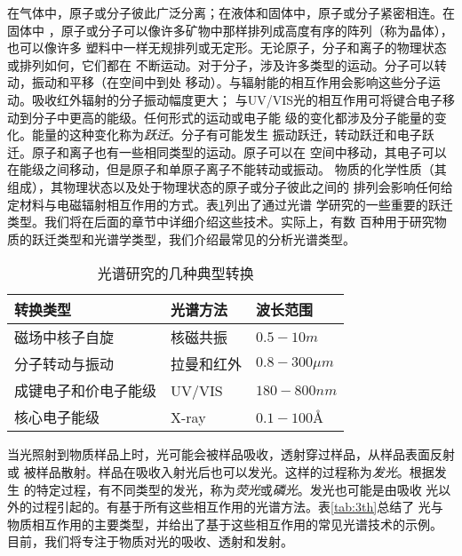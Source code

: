 在气体中，原子或分子彼此广泛分离；在液体和固体中，原子或分子紧密相连。在固体中
，原子或分子可以像许多矿物中那样排列成高度有序的阵列（称为晶体），也可以像许多
塑料中一样无规排列或无定形。无论原子，分子和离子的物理状态或排列如何，它们都在
不断运动。对于分子，涉及许多类型的运动。分子可以转动，振动和平移（在空间中到处
移动）。与辐射能的相互作用会影响这些分子运动。吸收红外辐射的分子振动幅度更大；
与UV/VIS光的相互作用可将键合电子移动到分子中更高的能级。任何形式的运动或电子能
级的变化都涉及分子能量的变化。能量的这种变化称为\emph{跃迁}。分子有可能发生
振动跃迁，转动跃迁和电子跃迁。原子和离子也有一些相同类型的运动。原子可以在
空间中移动，其电子可以在能级之间移动，但是原子和单原子离子不能转动或振动。
物质的化学性质（其组成），其物理状态以及处于物理状态的原子或分子彼此之间的
排列会影响任何给定材料与电磁辐射相互作用的方式。表\ref{tab:2nd}列出了通过光谱
学研究的一些重要的跃迁类型。我们将在后面的章节中详细介绍这些技术。实际上，有数
百种用于研究物质的跃迁类型和光谱学类型，我们介绍最常见的分析光谱类型。

\begin{table}[htbp]
    \centering
    \caption{光谱研究的几种典型转换}
    \label{tab:2nd}
    \begin{tabular}{lll}
        \hline
        转换类型& 光谱方法 & 波长范围 \\
        \hline
        磁场中核子自旋 & 核磁共振 & $0.5-10 m$\\
        分子转动与振动 & 拉曼和红外 & $0.8-300 \mu m$\\
        成键电子和价电子能级 & UV/VIS & $180-800 nm$\\
        核心电子能级 & X-ray & $0.1-100 $\AA\\
        \hline
    \end{tabular}
\end{table}

当光照射到物质样品上时，光可能会被样品吸收，透射穿过样品，从样品表面反射或
被样品散射。样品在吸收入射光后也可以发光。这样的过程称为\emph{发光}。根据发生
的特定过程，有不同类型的发光，称为\emph{荧光}或\emph{磷光}。发光也可能是由吸收
光以外的过程引起的。有基于所有这些相互作用的光谱方法。表\ref{tab:3th}总结了
光与物质相互作用的主要类型，并给出了基于这些相互作用的常见光谱技术的示例。
目前，我们将专注于物质对光的吸收、透射和发射。

